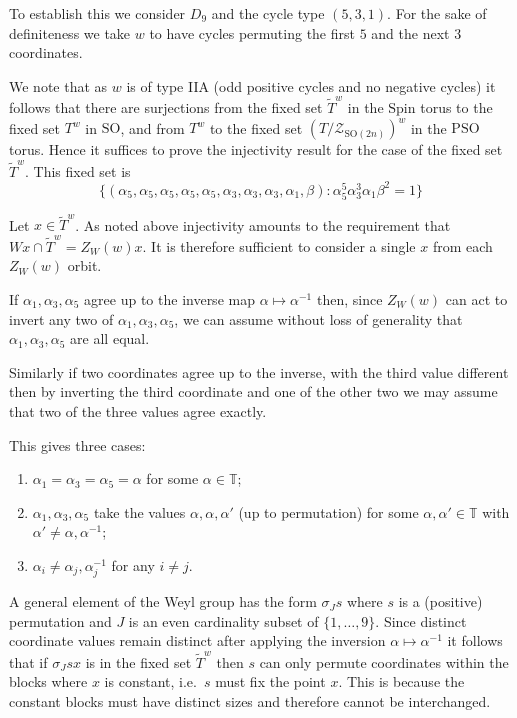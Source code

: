 \documentclass[11pt,a4paper]{article}
\def\Spin{\mathrm{Spin}}
\def\SO{\mathrm{SO}}
\def\PSO{\mathrm{PSO}}
\def\TT{\mathbb{T}}
\def\cZ{\mathcal{Z}}
\def\cZ{{\mathcal Z}}
\def\coveringtorus{\tilde{T}}
\def\ZDSO{\cZ_{\SO(2n)}}
\begin{document}
To establish this we consider $D_9$ and the cycle type $(5,3,1)$. For the sake of definiteness we take $w$ to have cycles permuting the first $5$ and the next $3$ coordinates.

We note that as $w$ is of type IIA (odd positive cycles and no negative cycles) it follows that there are surjections from the fixed set  $\coveringtorus^w$ in the $\Spin$ torus to the fixed set $T^w$ in $\SO$, and from $T^w$ to the fixed set $(T/\ZDSO)^w$ in the $\PSO$ torus. Hence it suffices to prove the injectivity result for the case of the fixed set $\coveringtorus ^w$. This fixed set is
\[
\{(\alpha_5,\alpha_5,\alpha_5,\alpha_5,\alpha_5,\alpha_3,\alpha_3,\alpha_3,\alpha_1,\beta) : \alpha_5^5\alpha_3^3\alpha_1\beta^2=1\}
\]

Let $x\in \coveringtorus^w$. As noted above injectivity amounts to the requirement that $W\!x\cap\coveringtorus^w=Z_W(w)x$. It is  therefore sufficient to consider a single $x$ from each $Z_W(w)$ orbit.

If $\alpha_1,\alpha_3,\alpha_5$ agree up to the inverse map $\alpha\mapsto \alpha^{-1}$ then, since $Z_W(w)$ can act to invert any two of $\alpha_1,\alpha_3,\alpha_5$, we can assume without loss of generality that $\alpha_1,\alpha_3,\alpha_5$ are all equal.

Similarly if two coordinates agree up to the inverse, with the third value different then by inverting the third coordinate and one of the other two we may assume that two of the three values agree exactly.

This gives three cases:
\begin{enumerate}
    \item $\alpha_1=\alpha_3=\alpha_5=\alpha$ for some $\alpha\in \TT$;
    \item $\alpha_1,\alpha_3,\alpha_5$ take the values $\alpha,\alpha,\alpha'$ (up to permutation) for some $\alpha,\alpha'\in \TT$ with $\alpha'\neq \alpha,\alpha^{-1}$;
    \item $\alpha_i\neq \alpha_j,\alpha_j^{-1}$ for any $i\neq j$.
\end{enumerate}



A general element of the Weyl group has the form $\sigma_Js$ where $s$ is a (positive) permutation and $J$ is an even cardinality subset of $\{1,\dots,9\}$. Since distinct coordinate values remain distinct after applying the inversion $\alpha\mapsto \alpha^{-1}$ it follows that if $\sigma_Jsx$ is in the fixed set $\coveringtorus^w$ then $s$ can only permute coordinates within the blocks where $x$ is constant, i.e.\ $s$ must fix the point $x$. This is because the constant blocks must have distinct sizes and therefore cannot be interchanged.
\end{document}
